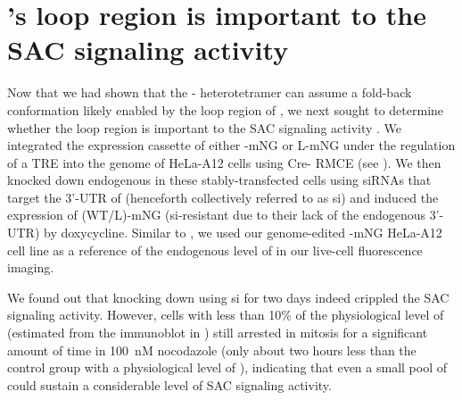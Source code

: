\section{'s loop region is important to the SAC signaling activity }
\label{LoopDeletionSection}

Now that we had shown that the - heterotetramer can assume a fold-back conformation likely enabled by the loop region of , we next sought to determine whether the loop region is important to the SAC signaling activity . We integrated the expression cassette of either -mNG or \textDelta{}L-mNG under the regulation of a TRE into the genome of HeLa-A12 cells using Cre- RMCE (see ). We then knocked down endogenous  in these stably-transfected cells using siRNAs that target the 3'-UTR of  \cite{siMAD1-3UTR} (henceforth collectively referred to as si) and induced the expression of (WT/\textDelta{}L)-mNG (si-resistant due to their lack of the endogenous 3'-UTR) by doxycycline. Similar to , we used our genome-edited -mNG HeLa-A12 cell line as a reference of the endogenous level of  in our live-cell fluorescence imaging.

We found out that knocking down  using si for two days indeed crippled the SAC signaling activity. However, cells with less than 10\% of the physiological level of  (estimated from the immunoblot in ) still arrested in mitosis for a significant amount of time in \SI{100}{nM} nocodazole (only about two hours less than the control group with a physiological level of ), indicating that even a small pool of  could sustain a considerable level of SAC signaling activity.


